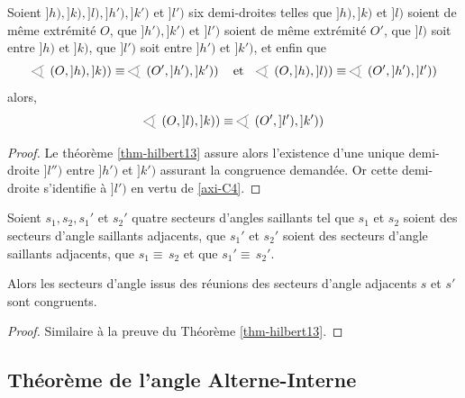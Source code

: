\begin{cor}\label{cor-congrudiffanglecongru}
Soient $]h),]k),]l),]h'),]k')$ et $]l')$ six demi-droites telles que $]h),]k)$ et $]l)$ soient de même extrémité $O$, que $]h'),]k')$ et $]l')$ soient de même extrémité $O'$, que $]l)$ soit entre $]h)$ et $]k)$, que $]l')$ soit entre $]h')$ et $]k')$, et enfin que 
    \begin{equation*}
        \anglesaillant \left(O,]h),]k)\right)\equiv\anglesaillant \left(O',]h'),]k')\right) \quad \text{et} \quad \anglesaillant \left(O,]h),]l)\right)\equiv\anglesaillant \left(O',]h'),]l')\right)
    \end{equation*}
alors,
\begin{equation*}
    \anglesaillant \left(O,]l),]k)\right)\equiv\anglesaillant \left(O',]l'),]k')\right)
\end{equation*}
\begin{proof}
    Le théorème \ref{thm-hilbert13} assure alors l'existence d'une unique demi-droite $]l'')$ entre $]h')$ et $]k')$ assurant la congruence demandée. Or cette demi-droite s'identifie à $]l')$ en vertu de \ref{axi-C4}.
\end{proof}
\end{cor}
\begin{thm}
    Soient $s_1,s_2, s_1'$ et $s_2'$ quatre secteurs d'angles saillants tel que $s_1$ et $s_2$ soient des secteurs d'angle saillants adjacents, que $s_1'$ et $s_2'$ soient des secteurs d'angle saillants adjacents, que $s_1 \equiv \, s_2$ et que $s_1' \equiv \, s_2'$. 

    Alors les secteurs d'angle issus des réunions des secteurs d'angle adjacents $s$ et $s'$ sont congruents. 
\begin{proof}
    Similaire à la preuve du Théorème \ref{thm-hilbert13}.
\end{proof}
\end{thm}

        \subsection{Théorème de l'angle Alterne-Interne}


